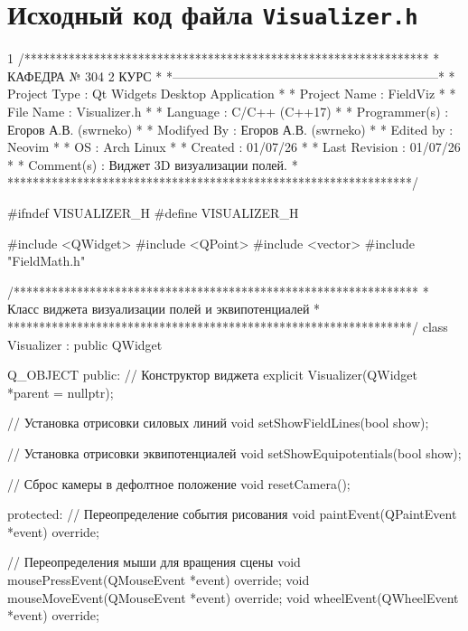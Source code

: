 \section{Исходный код файла \texttt{Visualizer.h}}
\footnotesize
\begin{listing}{1}
/****************************************************************
*                     КАФЕДРА № 304 2 КУРС                       *
*---------------------------------------------------------------*
* Project Type  : Qt Widgets Desktop Application                *
* Project Name  : FieldViz                                      *
* File Name     : Visualizer.h                                   *
* Language      : C/C++ (C++17)                                  *
* Programmer(s) : Егоров А.В. (swrneko)                          *
* Modifyed By   : Егоров А.В. (swrneko)                          *
* Edited by     : Neovim                                         *
* OS            : Arch Linux                                     *
* Created       : 01/07/26                                       *
* Last Revision : 01/07/26                                       *
* Comment(s)    : Виджет 3D визуализации полей.                  *
****************************************************************/

#ifndef VISUALIZER_H
#define VISUALIZER_H

#include <QWidget>
#include <QPoint>
#include <vector>
#include "FieldMath.h"

/****************************************************************
* Класс виджета визуализации полей и эквипотенциалей            *
****************************************************************/
class Visualizer : public QWidget {
  Q_OBJECT
public:
  // Конструктор виджета
  explicit Visualizer(QWidget *parent = nullptr);

  // Установка отрисовки силовых линий
  void setShowFieldLines(bool show);

  // Установка отрисовки эквипотенциалей
  void setShowEquipotentials(bool show);

  // Сброс камеры в дефолтное положение
  void resetCamera();

protected:
  // Переопределение события рисования
  void paintEvent(QPaintEvent *event) override;

  // Переопределения мыши для вращения сцены
  void mousePressEvent(QMouseEvent *event) override;
  void mouseMoveEvent(QMouseEvent *event) override;
  void wheelEvent(QWheelEvent *event) override;

}
\end{listing}
